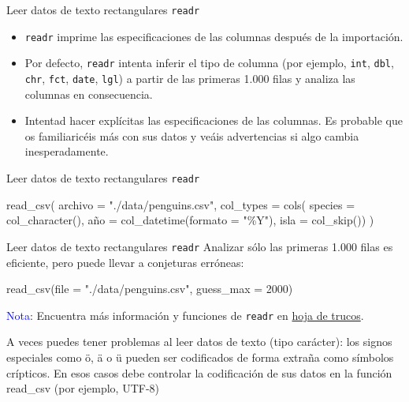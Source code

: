 \documentclass[
  ignorenonframetext,
  aspectratio=169]{beamer}
\newenvironment{Shaded}{\begin{snugshade}}{\end{snugshade}}
\newcommand{\AttributeTok}[1]{\textcolor[rgb]{0.77,0.63,0.00}{#1}}
\newcommand{\DecValTok}[1]{\textcolor[rgb]{0.00,0.00,0.81}{#1}}
\newcommand{\FunctionTok}[1]{\textcolor[rgb]{0.00,0.00,0.00}{#1}}
\newcommand{\NormalTok}[1]{#1}
\newcommand{\OtherTok}[1]{\textcolor[rgb]{0.56,0.35,0.01}{#1}}
\newcommand{\StringTok}[1]{\textcolor[rgb]{0.31,0.60,0.02}{#1}}
\newcommand\blue[1]{\textcolor{blue}{#1}}
\begin{document}
\begin{frame}[fragile]{Leer datos de texto rectangulares \texttt{readr}}
\protect\hypertarget{leer-datos-de-texto-rectangulares-readr-5}{}
\begin{itemize}
\item
  \texttt{readr} imprime las especificaciones de las columnas después de
  la importación.
\item
  Por defecto, \texttt{readr} intenta inferir el tipo de columna (por
  ejemplo, \texttt{int}, \texttt{dbl}, \texttt{chr}, \texttt{fct},
  \texttt{date}, \texttt{lgl}) a partir de las primeras 1.000 filas y
  analiza las columnas en consecuencia.
\item
  Intentad hacer explícitas las especificaciones de las columnas. Es
  probable que os familiaricéis más con sus datos y veáis advertencias
  si algo cambia inesperadamente.
\end{itemize}
\end{frame}

\begin{frame}[fragile]{Leer datos de texto rectangulares \texttt{readr}}
\protect\hypertarget{leer-datos-de-texto-rectangulares-readr-6}{}
\begin{Shaded}
\begin{Highlighting}[]
\FunctionTok{read\_csv}\NormalTok{(}
  \AttributeTok{archivo =} \StringTok{"./data/penguins.csv"}\NormalTok{,}
  \AttributeTok{col\_types =} \FunctionTok{cols}\NormalTok{(}
    \AttributeTok{species =} \FunctionTok{col\_character}\NormalTok{(),}
\NormalTok{    año }\OtherTok{=} \FunctionTok{col\_datetime}\NormalTok{(}\AttributeTok{formato =} \StringTok{"\%Y"}\NormalTok{),}
    \AttributeTok{isla =} \FunctionTok{col\_skip}\NormalTok{())}
\NormalTok{  )}
\end{Highlighting}
\end{Shaded}
\end{frame}

\begin{frame}[fragile]{Leer datos de texto rectangulares \texttt{readr}}
\protect\hypertarget{leer-datos-de-texto-rectangulares-readr-7}{}
Analizar sólo las primeras 1.000 filas es eficiente, pero puede llevar a
conjeturas erróneas:

\begin{Shaded}
\begin{Highlighting}[]
\FunctionTok{read\_csv}\NormalTok{(}\AttributeTok{file =} \StringTok{"./data/penguins.csv"}\NormalTok{, }\AttributeTok{guess\_max =} \DecValTok{2000}\NormalTok{)}
\end{Highlighting}
\end{Shaded}

\blue{Nota}: Encuentra más información y funciones de \texttt{readr} en
\href{https://raw.githubusercontent.com/rstudio/cheatsheets/master/data-import.pdf}{hoja
de trucos}.

A veces puedes tener problemas al leer datos de texto (tipo carácter):
los signos especiales como ö, ä o ü pueden ser codificados de forma
extraña como símbolos crípticos. En esos casos debe controlar la
codificación de sus datos en la función read\_csv (por ejemplo, UTF-8)
\end{frame}
\end{document}
